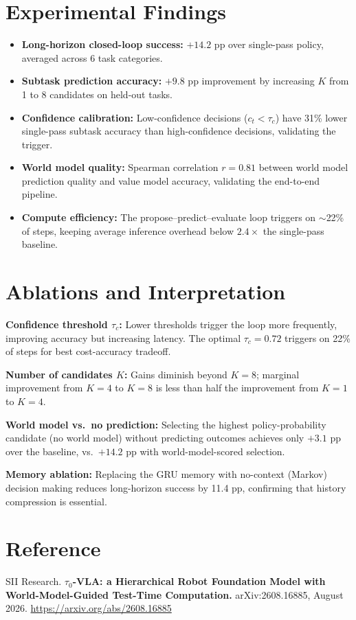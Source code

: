 \documentclass[10pt,twocolumn]{article}
\begin{document}
\section{Experimental Findings}

\begin{itemize}[itemsep=2pt,parsep=0pt]
  \item \textbf{Long-horizon closed-loop success:} $+14.2$ pp over
    single-pass policy, averaged across 6 task categories.
  \item \textbf{Subtask prediction accuracy:} $+9.8$ pp improvement
    by increasing $K$ from 1 to 8 candidates on held-out tasks.
  \item \textbf{Confidence calibration:} Low-confidence decisions
    ($c_t < \tau_c$) have 31\% lower single-pass subtask accuracy
    than high-confidence decisions, validating the trigger.
  \item \textbf{World model quality:} Spearman correlation $r=0.81$
    between world model prediction quality and value model accuracy,
    validating the end-to-end pipeline.
  \item \textbf{Compute efficiency:} The propose--predict--evaluate
    loop triggers on $\sim$22\% of steps, keeping average inference
    overhead below $2.4\times$ the single-pass baseline.
\end{itemize}

\section{Ablations and Interpretation}

\textbf{Confidence threshold $\tau_c$:} Lower thresholds trigger
the loop more frequently, improving accuracy but increasing latency.
The optimal $\tau_c = 0.72$ triggers on 22\% of steps for best
cost-accuracy tradeoff.

\textbf{Number of candidates $K$:} Gains diminish beyond $K=8$;
marginal improvement from $K=4$ to $K=8$ is less than half the
improvement from $K=1$ to $K=4$.

\textbf{World model vs.\ no prediction:} Selecting the highest
policy-probability candidate (no world model) without predicting
outcomes achieves only $+3.1$ pp over the baseline, vs.\ $+14.2$ pp
with world-model-scored selection.

\textbf{Memory ablation:} Replacing the GRU memory with no-context
(Markov) decision making reduces long-horizon success by 11.4 pp,
confirming that history compression is essential.

\section*{Reference}

SII Research.
\textbf{$\tau_0$-VLA: a Hierarchical Robot Foundation Model with
World-Model-Guided Test-Time Computation.}
arXiv:2608.16885, August 2026.
\url{https://arxiv.org/abs/2608.16885}
\end{document}
